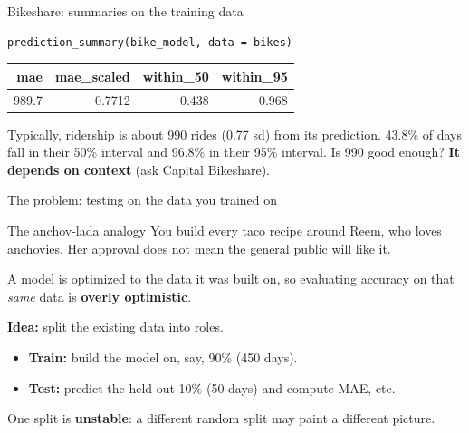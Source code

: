 \documentclass[aspectratio=43,11pt]{beamer}
\begin{document}
{\begin{frame}[fragile]{Bikeshare: summaries on the training data}
\begin{lstlisting}
prediction_summary(bike_model, data = bikes)
\end{lstlisting}
  \begin{center}
  \begin{tabular}{rrrr}
    \toprule
    mae & mae\_scaled & within\_50 & within\_95\\
    \midrule
    989.7 & 0.7712 & 0.438 & 0.968\\
    \bottomrule
  \end{tabular}
  \end{center}
  Typically, ridership is about 990 rides (0.77 sd) from its prediction. 43.8\% of days fall in their 50\% interval and 96.8\% in their 95\% interval. Is 990 good enough? \textbf{It depends on context} (ask Capital Bikeshare).
\end{frame}
}

\begin{frame}{The problem: testing on the data you trained on}
  \begin{block}{The anchov-lada analogy}
    You build every taco recipe around Reem, who loves anchovies. Her approval does not mean the general public will like it.
  \end{block}
  A model is optimized to the data it was built on, so evaluating accuracy on that \emph{same} data is \textbf{overly optimistic}.

  \medskip
  \textbf{Idea:} split the existing data into roles.
  \begin{itemize}
    \item \textbf{Train:} build the model on, say, 90\% (450 days).
    \item \textbf{Test:} predict the held-out 10\% (50 days) and compute MAE, etc.
  \end{itemize}
  One split is \textbf{unstable}: a different random split may paint a different picture.
\end{frame}
\end{document}
